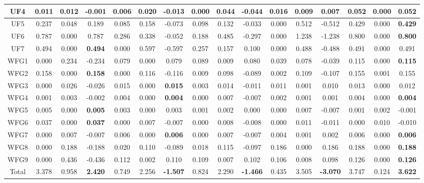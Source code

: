 \begin{table}[h]
{\begin{tabular}{|c|c|c|c|c|c|c|c|c|c|c|c|c|c|c|c|}
UF4 & 0.011 & 0.012 & -0.001 & 0.006 & 0.020 & -0.013 & 0.000 & 0.044 & -0.044 & 0.016 & 0.009 & 0.007 & 0.052 & 0.000 & \textbf{0.052} \\ \hline
UF5 & 0.237 & 0.048 & 0.189 & 0.085 & 0.158 & -0.073 & 0.098 & 0.132 & -0.033 & 0.000 & 0.512 & -0.512 & 0.429 & 0.000 & \textbf{0.429} \\ \hline
UF6 & 0.787 & 0.000 & 0.787 & 0.286 & 0.338 & -0.052 & 0.188 & 0.485 & -0.297 & 0.000 & 1.238 & -1.238 & 0.800 & 0.000 & \textbf{0.800} \\ \hline
UF7 & 0.494 & 0.000 & \textbf{0.494} & 0.000 & 0.597 & -0.597 & 0.257 & 0.157 & 0.100 & 0.000 & 0.488 & -0.488 & 0.491 & 0.000 & 0.491 \\ \hline
WFG1 & 0.000 & 0.234 & -0.234 & 0.079 & 0.000 & 0.079 & 0.089 & 0.009 & 0.080 & 0.039 & 0.078 & -0.039 & 0.115 & 0.000 & \textbf{0.115} \\ \hline
WFG2 & 0.158 & 0.000 & \textbf{0.158} & 0.000 & 0.116 & -0.116 & 0.009 & 0.098 & -0.089 & 0.002 & 0.109 & -0.107 & 0.155 & 0.001 & 0.155 \\ \hline
WFG3 & 0.000 & 0.026 & -0.026 & 0.015 & 0.000 & \textbf{0.015} & 0.003 & 0.014 & -0.011 & 0.011 & 0.001 & 0.010 & 0.013 & 0.000 & 0.012 \\ \hline
WFG4 & 0.001 & 0.003 & -0.002 & 0.004 & 0.000 & \textbf{0.004} & 0.000 & 0.007 & -0.007 & 0.002 & 0.001 & 0.001 & 0.004 & 0.000 & \textbf{0.004} \\ \hline
WFG5 & 0.005 & 0.000 & \textbf{0.005} & 0.003 & 0.000 & 0.003 & 0.001 & 0.002 & 0.000 & 0.000 & 0.007 & -0.007 & 0.001 & 0.002 & -0.001 \\ \hline
WFG6 & 0.037 & 0.000 & \textbf{0.037} & 0.000 & 0.007 & -0.007 & 0.000 & 0.008 & -0.008 & 0.000 & 0.011 & -0.011 & 0.000 & 0.010 & -0.010 \\ \hline
WFG7 & 0.000 & 0.007 & -0.007 & 0.006 & 0.000 & \textbf{0.006} & 0.000 & 0.007 & -0.007 & 0.004 & 0.001 & 0.002 & 0.006 & 0.000 & \textbf{0.006} \\ \hline
WFG8 & 0.000 & 0.188 & -0.188 & 0.020 & 0.110 & -0.089 & 0.018 & 0.115 & -0.097 & 0.186 & 0.000 & 0.186 & 0.188 & 0.000 & \textbf{0.188} \\ \hline
WFG9 & 0.000 & 0.436 & -0.436 & 0.112 & 0.002 & 0.110 & 0.109 & 0.007 & 0.102 & 0.106 & 0.008 & 0.098 & 0.126 & 0.000 & \textbf{0.126} \\ \hline
Total & 3.378 & 0.958 & \textbf{2.420} & 0.749 & 2.256 & \textbf{-1.507} & 0.824 & 2.290 & \textbf{-1.466} & 0.435 & 3.505 & \textbf{-3.070} & 3.747 & 0.124 & \textbf{3.622} \\ \hline
\end{tabular}%
}
\end{table}



